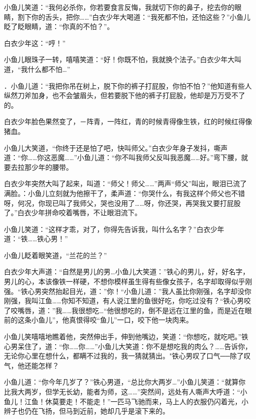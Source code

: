 \documentclass[12pt,oneside]{book}
\begin{document}
小鱼儿笑道：``我何必杀你，你若要食言反悔，我就切下你的鼻子，挖去你的眼睛，割下你的舌头，把你\ldots\ldots{}''白衣少年大喝道：``我死都不怕，还怕这些？''小鱼儿眨了眨眼睛，道：``你真的不怕？''。

白衣少年这：``哼！''

小鱼儿眼珠子一转，嘻嘻笑道：``好！你既不怕，我就换个法子。''白衣少年大叫道，``我什么都不怕\ldots{}''

．小鱼儿道：``我把你吊在树上，脱下你的裤子打屁股，你怕不怕？''他知道有些人纵然刀斧加身，也不会皱眉头，但若要脱下他的裤子打屁股，他却是万万受不了的。

白衣少年脸色果然变了，－阵青，一阵红，青的时候青得像生铁，红的时候红得像猪血。

小鱼儿大笑道，``你终于还是怕了吧，快叫师父。''白衣少年身子发抖，嘶声道：``你\ldots\ldots 你这恶魔\ldots\ldots{}''小鱼儿道：``你不叫我师父反叫我恶魔\ldots\ldots 好。''弯下腰，就要去拉那少年的腰带。

白衣少年突然大叫了起来，叫道：``师父！师父\ldots\ldots{}''两声``师父''叫出，眼泪已流了满脸。：小鱼儿立刻就为他擦干了，柔声道：``你哭什么，有我这样个师父也不错呀，何况，你现已叫了我师父，哭也没用了\ldots\ldots 呀，你还哭，再哭我又要打屁股了。''白衣少年拼命咬着嘴唇，不让眼泪流下。

小鱼儿笑道：``这样才乖，对了，你得先告诉我，叫什么名字？''白衣少年道：``铁\ldots\ldots 铁心男！''

小鱼儿眨着眼笑道，``兰花的兰？''

白衣少年大声道：``自然是男儿的男\ldots 小鱼儿大笑道：''铁心的男儿，好，好名字，男儿的心，本该像铁一样硬，不想你模样虽生得有些像女孩子，名字却取得似乎刚强。``铁心男突然抬起目光，道：''你！``小鱼儿道：''我人虽比你刚强，名字却没你刚强，我叫江鱼\ldots\ldots 你知不知道，有人说江里的鱼很好吃，你吃过没有？``铁心男咬了咬嘴唇，道：''我\ldots\ldots 我很想吃\ldots{}``他很想吃的，倒不是远在江里的鱼，而是近在眼前的这条小鱼儿''，他真恨得咬``鱼儿''一口，咬下他一块肉来。

小鱼儿笑嘻嘻地瞧着他，突然伸出手，伸到他嘴边，笑道：``你想吃，就吃吧。''铁心男呆住了，道：``你\ldots\ldots 你\ldots\ldots{}''小鱼儿大笑道：你不是想吃我的肉么？\ldots\ldots 告诉你，无论你心里在想什么，都瞒不过我的，我一猜就猜出。"铁心男叹了口气──除了叹气，他还能怎样？

小鱼儿道：``你今年几岁了？''铁心男道，``总比你大两岁\ldots{}''小鱼儿笑道：``就算你比我大两岁，但学无长幼，能者为师，这\ldots\ldots{}''突然间，远处有人嘶声大呼道：``小鱼儿！江鱼！休莫要走！不能走！''一匹马飞驰而来，马上人的衣服仍闪着光，小辨子也仍在飞扬，但马到近前，她却几乎是滚下来的。
\end{document}
